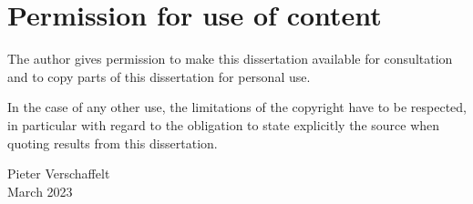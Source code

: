 \chapter*{Permission for use of content}
The author gives permission to make this dissertation available for consultation and to copy parts of this dissertation for personal use.

In the case of any other use, the limitations of the copyright have to be respected, in particular with regard to the obligation to state explicitly the source when quoting results from this dissertation.

\begin{flushright}
    Pieter Verschaffelt \\
    March 2023
\end{flushright}

